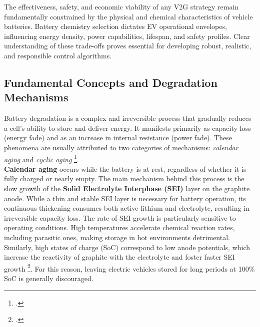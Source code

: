 The effectiveness, safety, and economic viability of any V2G strategy remain fundamentally constrained by the physical and chemical characteristics of vehicle batteries. Battery chemistry selection dictates EV operational envelopes, influencing energy density, power capabilities, lifespan, and safety profiles. Clear understanding of these trade-offs proves essential for developing robust, realistic, and responsible control algorithms.
\subsection{Fundamental Concepts and Degradation Mechanisms}

Battery degradation is a complex and irreversible process that gradually reduces a cell’s ability to store and deliver energy. It manifests primarily as capacity loss (energy fade) and as an increase in internal resistance (power fade). These phenomena are usually attributed to two categories of mechanisms: \textit{calendar aging} and \textit{cyclic aging} \footcite{birkl2017degradation}.
\noindent   
\\
\textbf{Calendar aging} occurs while the battery is at rest, regardless of whether it is fully charged or nearly empty. The main mechanism behind this process is the slow growth of the \textbf{Solid Electrolyte Interphase (SEI)} layer on the graphite anode. While a thin and stable SEI layer is necessary for battery operation, its continuous thickening consumes both active lithium and electrolyte, resulting in irreversible capacity loss. The rate of SEI growth is particularly sensitive to operating conditions. High temperatures accelerate chemical reaction rates, including parasitic ones, making storage in hot environments detrimental. Similarly, high states of charge (SoC) correspond to low anode potentials, which increase the reactivity of graphite with the electrolyte and foster faster SEI growth \footcite{vetter2005ageing}. For this reason, leaving electric vehicles stored for long periods at 100\% SoC is generally discouraged.
\noindent   
\\
